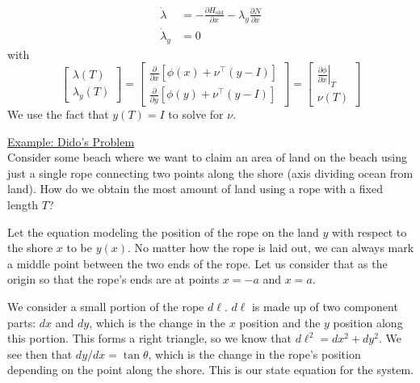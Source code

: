 \documentclass{article}
\begin{document}
\begin{align*}
    \dot{\lambda} &= -\frac{\partial H_\text{old}}{\partial x} - \lambda_y\frac{\partial N}{\partial x} \\
    \dot{\lambda}_y &= 0
\end{align*}
with
\[\left[\begin{matrix}
    \lambda(T) \\
    \lambda_y(T)
\end{matrix}\right] = \left[\begin{matrix}
    \frac{\partial}{\partial x}\left[\phi(x)+\nu^\top(y-I)\right] \\[2mm]
    \frac{\partial}{\partial y}\left[\phi(y)+\nu^\top(y-I)\right]
\end{matrix}\right] = \left[\begin{matrix}
    \left.\frac{\partial\phi}{\partial x}\right|_{T} \\[2mm]
    \nu(T)
\end{matrix}\right]\]
We use the fact that $y(T) = I$ to solve for $\nu$.

\noindent
\underline{Example: Dido's Problem}\\[2mm]
Consider some beach where we want to claim an area of land on the beach
using just a single rope connecting two points along the shore (axis dividing ocean from land).
How do we obtain the most amount of land using a rope with a fixed length $T$?

\noindent
Let the equation modeling the position of the rope on the land $y$ with respect to the shore $x$
to be $y(x)$. No matter how the rope is laid out, we can always mark a middle point between the
two ends of the rope. Let us consider that as the origin so that the rope's ends are at points
$x = -a$ and $x = a$.

\noindent
We consider a small portion of the rope $d\ell$. $d\ell$ is made up of two component parts:
$dx$ and $dy$, which is the change in the $x$ position and the $y$ position along this portion.
This forms a right triangle, so we know that $d\ell^2 = dx^2 + dy^2$. We see then that
$dy/dx = \tan\theta$, which is the change in the rope's position depending on the point
along the shore. This is our state equation for the system.
\end{document}
